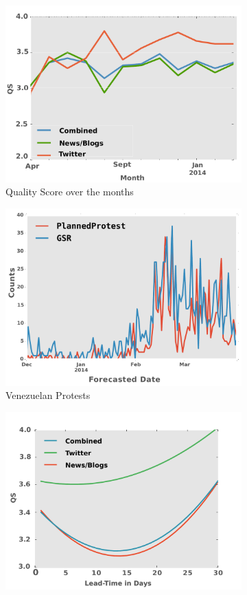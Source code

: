 \documentclass[letterpaper]{article}
\begin{document}
\begin{figure}
\begin{subfigure}{0.33\columnwidth}
    \centering
  \includegraphics[width=0.85\columnwidth]{monthlyqs}
  \caption{\scriptsize Quality Score over the months}
  \label{fig:monthlyqs}
\end{subfigure}%
\begin{subfigure}{0.33\columnwidth}
    \centering
  \includegraphics[width=0.85\columnwidth]{venezuela_new}
  \caption{\scriptsize Venezuelan Protests}
  \label{fig:venezuela_feb}
\end{subfigure}%
\begin{subfigure}{0.33\columnwidth}
    \centering
  \includegraphics[width=0.85\columnwidth]{leadTimeVsQS}

\end{subfigure}
\end{figure}
\end{document}
